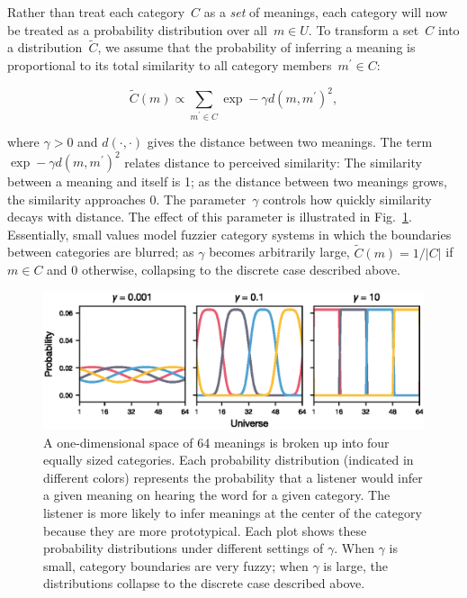 \documentclass[a4paper, 11pt]{article}
\begin{document}
Rather than treat each category~$C$ as a \textit{set} of meanings, each category will now be treated as a probability distribution over all~$m \in U$. To transform a set~$C$ into a distribution~$\tilde{C}$, we assume that the probability of inferring a meaning is proportional to its total similarity to all category members~$m^\prime \in C$:

	\begin{equation}
	\tilde{C}(m) \propto \sum_{m^\prime \in C} \exp -\gamma d(m,m^\prime)^2,
	\label{eq_cost_gaussian}
	\end{equation}

\noindent
where $\gamma > 0$ and $d(\cdot,\cdot)$ gives the distance between two meanings. The term $\exp -\gamma d(m,m^\prime)^2$ relates distance to perceived similarity: The similarity between a meaning and itself is 1; as the distance between two meanings grows, the similarity approaches 0. The parameter~$\gamma$ controls how quickly similarity decays with distance. The effect of this parameter is illustrated in Fig.~\ref{fg_gaussians}. Essentially, small values model fuzzier category systems in which the boundaries between categories are blurred; as $\gamma$ becomes arbitrarily large, $\tilde{C}(m) = 1/|C|$ if $m \in C$ and 0 otherwise, collapsing to the discrete case described above.

	\begin{figure}
	\begin{center}
	\includegraphics[]{gaussians.eps}
	\caption{A one-dimensional space of 64 meanings is broken up into four equally sized categories. Each probability distribution (indicated in different colors) represents the probability that a listener would infer a given meaning on hearing the word for a given category. The listener is more likely to infer meanings at the center of the category because they are more prototypical. Each plot shows these probability distributions under different settings of $\gamma$. When $\gamma$ is small, category boundaries are very fuzzy; when $\gamma$ is large, the distributions collapse to the discrete case described above.}
	\label{fg_gaussians}
	\end{center}
	\end{figure}
\end{document}
